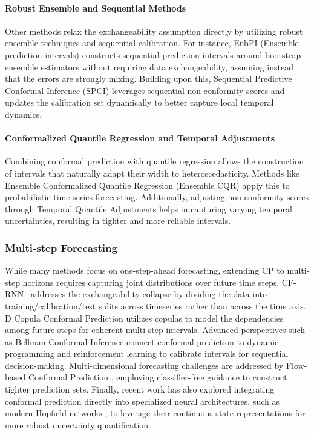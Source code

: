 \documentclass[12pt, a4paper]{article}
\begin{document}
\paragraph{Robust Ensemble and Sequential Methods}
Other methods relax the exchangeability assumption directly by utilizing robust ensemble techniques and sequential calibration. For instance, EnbPI (Ensemble prediction intervals) \cite{enbpi-1} constructs sequential prediction intervals around bootstrap ensemble estimators without requiring data exchangeability, assuming instead that the errors are strongly mixing. Building upon this, Sequential Predictive Conformal Inference (SPCI) \cite{spci} leverages sequential non-conformity scores and updates the calibration set dynamically to better capture local temporal dynamics.

\paragraph{Conformalized Quantile Regression and Temporal Adjustments}
Combining conformal prediction with quantile regression allows the construction of intervals that naturally adapt their width to heteroscedasticity. Methods like Ensemble Conformalized Quantile Regression (Ensemble CQR) \cite{encqr} apply this to probabilistic time series forecasting. Additionally, adjusting non-conformity scores through Temporal Quantile Adjustments \cite{tqa} helps in capturing varying temporal uncertainties, resulting in tighter and more reliable intervals.

\subsubsection{Multi-step Forecasting}
While many methods focus on one-step-ahead forecasting, extending CP to multi-step horizons requires capturing joint distributions over future time steps. CF-RNN~\cite{confrnn} addresses the exchangeability collapse by dividing the data into training/calibration/test splits across timeseries rather than across the time axis. D Copula Conformal Prediction \cite{copulacpts} utilizes copulas to model the dependencies among future steps for coherent multi-step intervals. Advanced perspectives such as Bellman Conformal Inference \cite{bellman-ci} connect conformal prediction to dynamic programming and reinforcement learning to calibrate intervals for sequential decision-making. Multi-dimensional forecasting challenges are addressed by Flow-based Conformal Prediction \cite{flow-cp}, employing classifier-free guidance to construct tighter prediction sets. Finally, recent work has also explored integrating conformal prediction directly into specialized neural architectures, such as modern Hopfield networks \cite{hop-cpt}, to leverage their continuous state representations for more robust uncertainty quantification.
\end{document}

